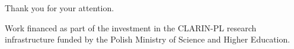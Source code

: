 \documentclass[Warsaw]{beamer}
\begin{document}

\begin{frame}
    \centering
    \vspace{6em}
    
    Thank you for your attention.
    
    \vspace{6em}
    
    \scriptsize
    \begin{center}
    Work financed as part of the investment in the CLARIN-PL research infrastructure funded by the Polish Ministry of Science and Higher Education.
    \end{center}
\end{frame}
  

\begin{frame}
\tiny


\end{frame}  

  
\end{document}
